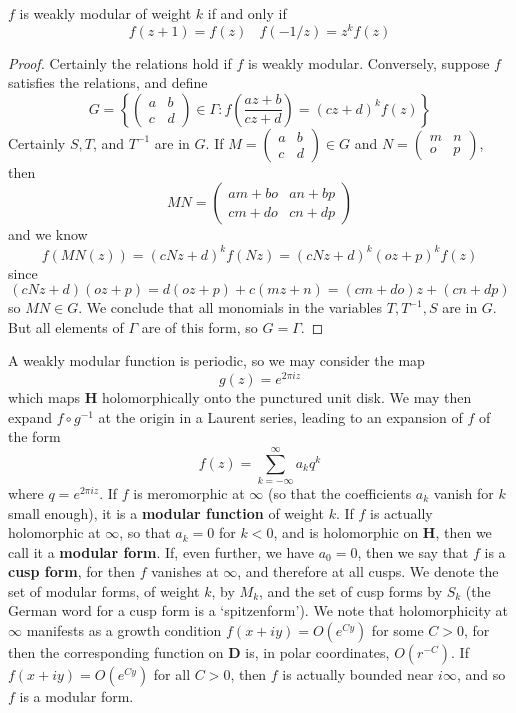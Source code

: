 \begin{theorem}
    $f$ is weakly modular of weight $k$ if and only if
    \[ f(z + 1) = f(z)\ \ \ \ f(-1/z) = z^k f(z) \]
\end{theorem}
\begin{proof}
    Certainly the relations hold if $f$ is weakly modular. Conversely, suppose $f$ satisfies the relations, and define
    \[ G = \left\{ \begin{pmatrix} a & b \\ c & d \end{pmatrix} \in \Gamma : f\left(\frac{az + b}{cz + d}\right) = (cz + d)^k f(z) \right\} \]
    Certainly $S, T$, and $T^{-1}$ are in $G$. If $M = \begin{pmatrix} a & b \\ c & d \end{pmatrix} \in G$ and $N = \begin{pmatrix} m & n \\ o & p \end{pmatrix}$, then
    \[ MN = \begin{pmatrix} am + bo & an + bp \\ cm + do & cn + dp \end{pmatrix} \]
    and we know
    \[ f\left( MN(z) \right) = (cNz + d)^k f(Nz) = (cNz + d)^k (oz + p)^k f(z) \]
    since
    \[ (cNz + d)(oz + p) = d(oz + p) + c(mz + n) = (cm + do)z + (cn + dp) \]
    so $MN \in G$. We conclude that all monomials in the variables $T, T^{-1}, S$ are in $G$. But all elements of $\Gamma$ are of this form, so $G = \Gamma$.
\end{proof}

A weakly modular function is periodic, so we may consider the map
%
\[ g(z) = e^{2 \pi i z} \]
%
which maps $\mathbf{H}$ holomorphically onto the punctured unit disk. We may then expand $f \circ g^{-1}$ at the origin in a Laurent series, leading to an expansion of $f$ of the form
%
\[ f(z) = \sum_{k = -\infty}^\infty a_kq^k \]
%
where $q = e^{2 \pi i z}$. If $f$ is meromorphic at $\infty$ (so that the coefficients $a_k$ vanish for $k$ small enough), it is a {\bf modular function} of weight $k$. If $f$ is actually holomorphic at $\infty$, so that $a_k = 0$ for $k < 0$, and is holomorphic on $\mathbf{H}$, then we call it a {\bf modular form}. If, even further, we have $a_0 = 0$, then we say that $f$ is a {\bf cusp form}, for then $f$ vanishes at $\infty$, and therefore at all cusps. We denote the set of modular forms, of weight $k$, by $M_k$, and the set of cusp forms by $S_k$ (the German word for a cusp form is a `spitzenform'). We note that holomorphicity at $\infty$ manifests as a growth condition $f(x + iy) = O(e^{Cy})$ for some $C > 0$, for then the corresponding function on $\mathbf{D}$ is, in polar coordinates, $O(r^{-C})$. If $f(x + iy) = O(e^{Cy})$ for all $C > 0$, then $f$ is actually bounded near $i \infty$, and so $f$ is a modular form.

